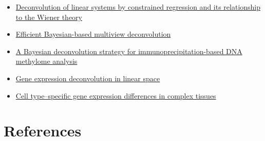 \documentclass[]{article}
\begin{document}
\begin{itemize}
\item
  \href{https://ieeexplore.ieee.org/abstract/document/4044778}{Deconvolution
  of linear systems by constrained regression and its relationship to
  the Wiener theory}
\item
  \href{https://www.nature.com/articles/nmeth.2929}{Efficient
  Bayesian-based multiview deconvolution}
\item
  \href{https://www.nature.com/articles/nbt1414}{A Bayesian
  deconvolution strategy for immunoprecipitation-based DNA methylome
  analysis}
\item
  \href{https://www.nature.com/articles/nmeth.1830}{Gene expression
  deconvolution in linear space}
\item
  \href{https://www.nature.com/articles/nmeth.1439}{Cell type--specific
  gene expression differences in complex tissues}
\end{itemize}

\hypertarget{references}{%
\section{References}\label{references}}
\end{document}
